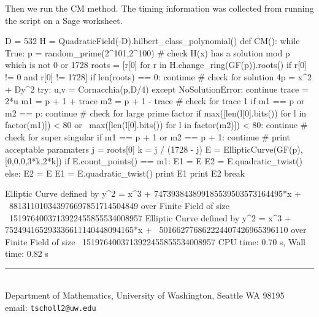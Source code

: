 \documentclass[11pt]{article}
\makeatletter
\newcommand{\myauthor}{Travis Scholl}
\newcommand{\myemail}{tscholl2@uw.edu}
\makeatother
\begin{document}
Then we run the CM method. The timing information was collected from running the script on a Sage worksheet.
\begin{sagecode}
\begin{sagecell}
D = 532
H = QuadraticField(-D).hilbert_class_polynomial()
def CM():
    while True:
        p = random_prime(2^101,2^100)
        # check H(x) has a solution mod p which is not 0 or 1728
        roots = [r[0] for r in H.change_ring(GF(p)).roots() if r[0] != 0 and r[0] != 1728]
        if len(roots) == 0:
            continue
        # check for solution 4p = x^2 + Dy^2
        try:
            u,v = Cornacchia(p,D/4)
        except NoSolutionError:
            continue
        trace = 2*u
        m1 = p + 1 + trace
        m2 = p + 1 - trace
        # check for trace 1
        if m1 == p or m2 == p:
            continue
        # check for large prime factor
        if max([len(l[0].bits()) for l in factor(m1)]) < 80 or \
            max([len(l[0].bits()) for l in factor(m2)]) < 80:
            continue
        # check for super singular
        if m1 == p + 1 or m2 == p + 1:
            continue
        # print acceptable paramaters
        j = roots[0]
        k = j / (1728 - j)
        E = EllipticCurve(GF(p),[0,0,0,3*k,2*k])
        if E.count_points() == m1:
            E1 = E
            E2 = E.quadratic_twist()
        else:
            E2 = E
            E1 = E.quadratic_twist()
        print E1
        print E2
        break
\end{sagecell}
\begin{sageout}
Elliptic Curve defined by y^2 = x^3 + 747393843899185539503573164495*x + \ 
881311010343976697851714504849 over Finite Field of size \
1519764003713922455855534008957
Elliptic Curve defined by y^2 = x^3 + 752494165293336611140448094165*x + \
501662776862224407426965396110 over Finite Field of size \
1519764003713922455855534008957
CPU time: 0.70 s, Wall time: 0.82 s
\end{sageout}
\end{sagecode}






\begin{center}
\noindent\rule{4cm}{.5pt}
\vspace{.25cm}

\noindent {\sc \small \myauthor}\\
{\small Department of Mathematics, University of Washington, Seattle WA 98195} \\
email: {\tt \myemail}
\end{center}
\end{document}

